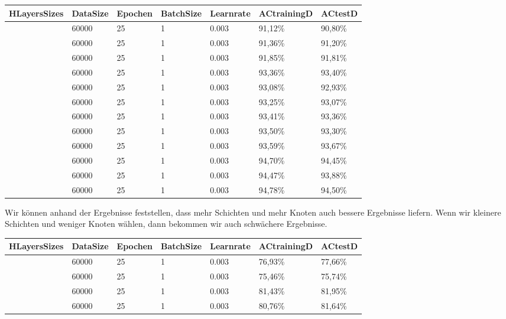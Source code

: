 \documentclass[12pt]{article}
\begin{document}
\begin{table}[H]
    \centering
    \begin{tabular}{|l|l|l|l|l|l|l|}
    \hline
        HLayersSizes & DataSize & Epochen & BatchSize & Learnrate & ACtrainingD & ACtestD \\ \hline
        [784, 100, 100, 10] & 60000 & 25 & 1 & 0.003 & 91,12\% & 90,80\% \\ \hline
        [784, 100, 100, 10] & 60000 & 25 & 1 & 0.003 & 91,36\% & 91,20\% \\ \hline
        [784, 100, 100, 10] & 60000 & 25 & 1 & 0.003 & 91,85\% & 91,81\% \\ \hline
        [784, 300, 10] & 60000 & 25 & 1 & 0.003 & 93,36\% & 93,40\% \\ \hline
        [784, 300, 10] & 60000 & 25 & 1 & 0.003 & 93,08\% & 92,93\% \\ \hline
        [784, 300, 10] & 60000 & 25 & 1 & 0.003 & 93,25\% & 93,07\% \\ \hline
        [784, 300, 100, 10] & 60000 & 25 & 1 & 0.003 & 93,41\% & 93,36\% \\ \hline
        [784, 300, 100, 10] & 60000 & 25 & 1 & 0.003 & 93,50\% & 93,30\% \\ \hline
        [784, 300, 100, 10] & 60000 & 25 & 1 & 0.003 & 93,59\% & 93,67\% \\ \hline
        [784, 500, 300, 10] & 60000 & 25 & 1 & 0.003 & 94,70\% & 94,45\% \\ \hline
        [784, 500, 300, 10] & 60000 & 25 & 1 & 0.003 & 94,47\% & 93,88\% \\ \hline
        [784, 500, 300, 10] & 60000 & 25 & 1 & 0.003 & 94,78\% & 94,50\% \\ \hline
    \end{tabular}
\end{table}
Wir können anhand der Ergebnisse feststellen, dass mehr Schichten und mehr Knoten auch bessere Ergebnisse liefern. Wenn wir kleinere Schichten und weniger Knoten wählen, dann bekommen wir auch schwächere Ergebnisse.
\begin{table}[H]
    \centering
    \begin{tabular}{|l|l|l|l|l|l|l|}
    \hline
        HLayersSizes & DataSize & Epochen & BatchSize & Learnrate & ACtrainingD & ACtestD \\ \hline
        [784, 10, 10, 10] & 60000 & 25 & 1 & 0.003 & 76,93\% & 77,66\% \\ \hline
        [784, 10, 10, 10] & 60000 & 25 & 1 & 0.003 & 75,46\% & 75,74\% \\ \hline
        [784, 10, 10] & 60000 & 25 & 1 & 0.003 & 81,43\% & 81,95\% \\ \hline
        [784, 10, 10] & 60000 & 25 & 1 & 0.003 & 80,76\% & 81,64\% \\ \hline
    \end{tabular}
\end{table}
\end{document}
